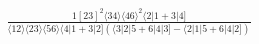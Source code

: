 \documentclass[varwidth, border=5pt]{standalone}
\begin{document}
\begin{my}
$\begin{gathered}
\scriptscriptstyle\frac{1[23]^2⟨34⟩⟨46⟩^2⟨2|1+3|4]}{⟨12⟩⟨23⟩⟨56⟩⟨4|1+3|2](⟨3|2|5+6|4|3]-⟨2|1|5+6|4|2])}
\end{gathered}$
\end{my}
\end{document}
